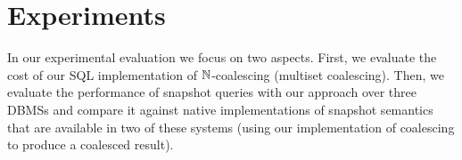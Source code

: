 




\section{Experiments}
\label{sec:experiments}

In our experimental evaluation we focus on two aspects. First, we
evaluate the cost of our SQL implementation of ${\mathbb{N}}$-coalescing
(multiset coalescing).  Then, we evaluate the performance of snapshot
queries with our approach over three DBMSs and compare it against
native implementations of snapshot semantics that are available in
two of these systems (using our implementation of coalescing to
produce a coalesced result).

